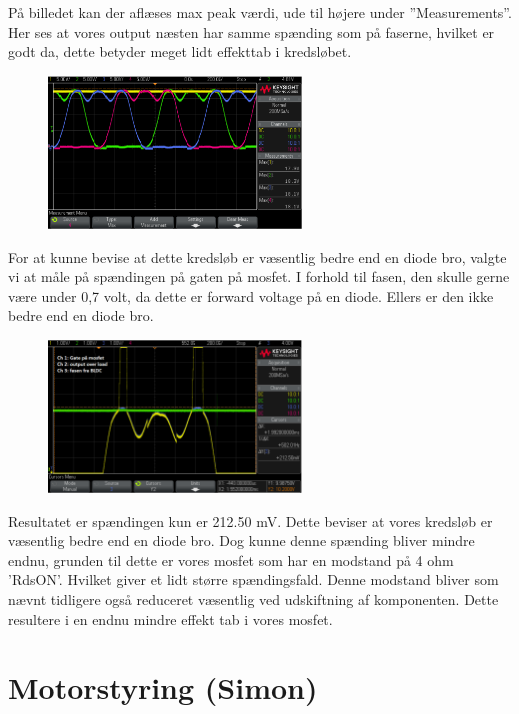 På billedet kan der aflæses max peak værdi, ude til højere under ”Measurements”. Her ses at vores output næsten har samme spænding som på faserne, hvilket er godt da, dette betyder meget lidt effekttab i kredsløbet.

\begin{figure}[h]
  \centering
  \includegraphics[width=0.6\textwidth]{graf1.png}
  \label{fig:graf1}
\end{figure}

For at kunne bevise at dette kredsløb er væsentlig bedre end en diode bro, valgte vi at måle på spændingen på gaten på mosfet. I forhold til fasen, den skulle gerne være under 0,7 volt, da dette er forward voltage på en diode. Ellers er den ikke bedre end en diode bro.

\begin{figure}[h]
  \centering
  \includegraphics[width=0.6\textwidth]{graf2.png}
  \label{fig:graf2}
\end{figure}

Resultatet er spændingen kun er 212.50 mV. Dette beviser at vores kredsløb er væsentlig bedre end en diode bro. Dog kunne denne spænding bliver mindre endnu, grunden til dette er vores mosfet som har en modstand på 4 ohm ’RdsON’. Hvilket giver et lidt større spændingsfald. Denne modstand bliver som nævnt tidligere også reduceret væsentlig ved udskiftning af komponenten. Dette resultere i en endnu mindre effekt tab i vores mosfet.
\clearpage

\section{Motorstyring (Simon)}
\label{sec:motorstyring}

